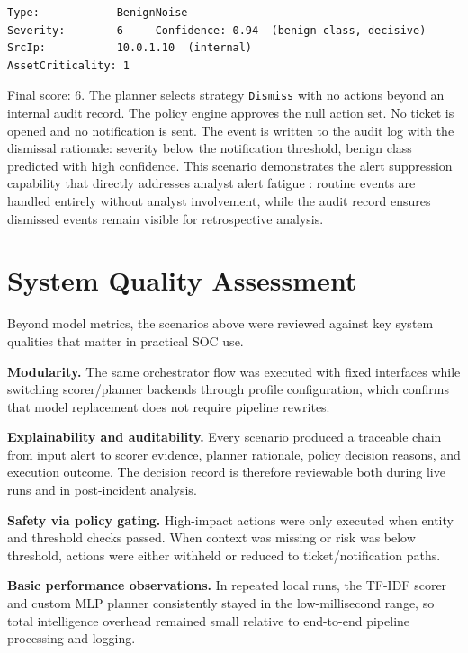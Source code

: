 \begin{verbatim}
Type:            BenignNoise
Severity:        6     Confidence: 0.94  (benign class, decisive)
SrcIp:           10.0.1.10  (internal)
AssetCriticality: 1
\end{verbatim}

Final score: 6. The planner selects strategy \texttt{Dismiss} with no actions beyond an internal audit record. The policy engine approves the null action set. No ticket is opened and no notification is sent. The event is written to the audit log with the dismissal rationale: severity below the notification threshold, benign class predicted with high confidence. This scenario demonstrates the alert suppression capability that directly addresses analyst alert fatigue \cite{ban2023alertfatigue}: routine events are handled entirely without analyst involvement, while the audit record ensures dismissed events remain visible for retrospective analysis.

\section{System Quality Assessment}
\label{sec:eval-system-qualities}

Beyond model metrics, the scenarios above were reviewed against key system qualities that
matter in practical SOC use.

\textbf{Modularity.} The same orchestrator flow was executed with fixed interfaces while
switching scorer/planner backends through profile configuration, which confirms that model
replacement does not require pipeline rewrites.

\textbf{Explainability and auditability.} Every scenario produced a traceable chain from
input alert to scorer evidence, planner rationale, policy decision reasons, and execution
outcome. The decision record is therefore reviewable both during live runs and in
post-incident analysis.

\textbf{Safety via policy gating.} High-impact actions were only executed when entity and
threshold checks passed. When context was missing or risk was below threshold, actions were
either withheld or reduced to ticket/notification paths.

\textbf{Basic performance observations.} In repeated local runs, the TF-IDF scorer and
custom MLP planner consistently stayed in the low-millisecond range, so total intelligence
overhead remained small relative to end-to-end pipeline processing and logging.

